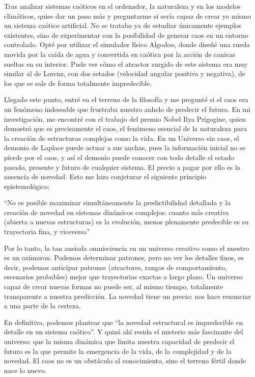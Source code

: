 \documentclass[
  10pt,
  a4paper,
  DIV=11,
  numbers=noendperiod,
  open=any]{scrreprt}
\numberwithin{equation}{chapter}
\numberwithin{equation}{section}
\renewcommand{\[}{\begin{equation}}
\renewcommand{\]}{\end{equation}}
\begin{document}
Tras analizar sistemas caóticos en el ordenador, la naturaleza y en los
modelos climáticos, quise dar un paso más y preguntarme si sería capaz
de crear yo mismo un sistema caótico artificial. No se trataba ya de
estudiar únicamente ejemplos existentes, sino de experimentar con la
posibilidad de generar caos en un entorno controlado. Opté por utilizar
el simulador físico Algodoo, donde diseñé una rueda movida por la caída
de agua y convertida en caótica por la acción de canicas sueltas en su
interior. Pude ver cómo el atractor surgido de este sistema era muy
similar al de Lorenz, con dos estados (velocidad angular positiva y
negativa), de los que se sale de forma totalmente impredecible.

Llegado este punto, entré en el terreno de la filosofía y me pregunté si
el caos era un fenómeno indeseable que frustraba nuestro anhelo de
predecir el futuro. En mi investigación, me encontré con el trabajo del
premio Nobel Ilya Prigogine, quien demostró que es precisamente el caos,
el fenómeno esencial de la naturaleza para la creación de estructuras
complejas como la vida. En un Universo sin caos, el demonio de Laplace
puede actuar a sus anchas, pues la información inicial no se pierde por
el caos, y así el demonio puede conocer con todo detalle el estado
pasado, presente y futuro de cualquier sistema. El precio a pagar por
ello es la ausencia de novedad. Esto me hizo conjeturar el siguiente
principio epistemológico:

``No es posible maximizar simultáneamente la predictibilidad detallada y
la creación de novedad en sistemas dinámicos complejos: cuanto más
creativa (abierta a nuevas estructuras) es la evolución, menos
plenamente predecible es su trayectoria fina, y viceversa''

Por lo tanto, la tan ansiada omnisciencia en un universo creativo como
el nuestro es un oxímoron. Podemos determinar patrones, pero no ver los
detalles finos, es decir, podemos anticipar patrones (atractores, rangos
de comportamiento, escenarios probables) mejor que trayectorias exactas
a largo plazo. Un universo capaz de crear nuevas formas no puede ser, al
mismo tiempo, totalmente transparente a nuestra predicción. La novedad
tiene un precio: nos hace renunciar a una parte de la certeza.

En definitiva, podemos plantear que ``la novedad estructural es
impredecible en detalle en un sistema caótico''. Y quizá ahí resida el
misterio más fascinante del universo: que la misma dinámica que limita
nuestra capacidad de predecir el futuro es la que permite la emergencia
de la vida, de la complejidad y de la novedad. El caos no es un
obstáculo al conocimiento, sino el terreno fértil donde nace lo nuevo.
\end{document}

